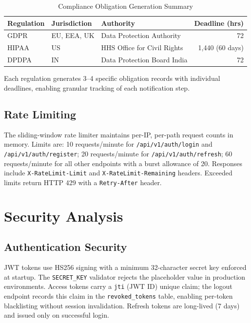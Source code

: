 \documentclass[conference]{IEEEtran}
\begin{document}
\begin{table}[h]
\caption{Compliance Obligation Generation Summary}
\label{tab:compliance}
\centering
\begin{tabular}{@{}lllr@{}}
\toprule
\textbf{Regulation} & \textbf{Jurisdiction} & \textbf{Authority} & \textbf{Deadline (hrs)} \\
\midrule
GDPR  & EU, EEA, UK & Data Protection Authority    & 72 \\
HIPAA & US          & HHS Office for Civil Rights  & 1,440 (60 days) \\
DPDPA & IN          & Data Protection Board India  & 72 \\
\bottomrule
\end{tabular}
\end{table}

Each regulation generates 3--4 specific obligation records with individual deadlines, enabling granular tracking of each notification step.

\subsection{Rate Limiting}

The sliding-window rate limiter maintains per-IP, per-path request counts in memory. Limits are: 10 requests/minute for \texttt{/api/v1/auth/login} and \texttt{/api/v1/auth/register}; 20 requests/minute for \texttt{/api/v1/auth/refresh}; 60 requests/minute for all other endpoints with a burst allowance of 20. Responses include \texttt{X-RateLimit-Limit} and \texttt{X-RateLimit-Remaining} headers. Exceeded limits return HTTP 429 with a \texttt{Retry-After} header.

\section{Security Analysis}

\subsection{Authentication Security}

JWT tokens use HS256 signing with a minimum 32-character secret key enforced at startup. The \texttt{SECRET\_KEY} validator rejects the placeholder value in production environments. Access tokens carry a \texttt{jti} (JWT ID) unique claim; the logout endpoint records this claim in the \texttt{revoked\_tokens} table, enabling per-token blacklisting without session invalidation. Refresh tokens are long-lived (7 days) and issued only on successful login.
\end{document}

